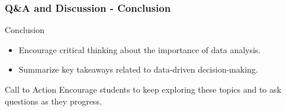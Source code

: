 \documentclass[aspectratio=169]{beamer}
\begin{document}
\begin{frame}[fragile]
    \frametitle{Q\&A and Discussion - Conclusion}
    \begin{block}{Conclusion}
    \begin{itemize}
        \item Encourage critical thinking about the importance of data analysis.
        \item Summarize key takeaways related to data-driven decision-making.
    \end{itemize}
    \end{block}

    \begin{block}{Call to Action}
    Encourage students to keep exploring these topics and to ask questions as they progress.
    \end{block}
\end{frame}
\end{document}
